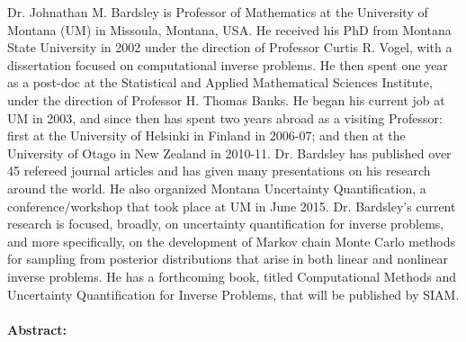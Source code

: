 \begin{wrapfloat}{figure}{o}{0pt}
  \texttt{[image: \{images/speakers/bardsleyj@mso.umt.edu]}.jpg}
\end{wrapfloat}

Dr. Johnathan M. Bardsley is Professor of Mathematics at the University of Montana (UM) in Missoula, Montana, USA. He received his PhD from Montana State University in 2002 under the direction of Professor Curtis R. Vogel, with a dissertation focused on computational inverse problems. He then spent one year as a post-doc at the Statistical and Applied Mathematical Sciences Institute, under the direction of Professor H. Thomas Banks. He began his current job at UM in 2003, and since then has spent two years abroad as a visiting Professor: first at the University of Helsinki in Finland in 2006-07; and then at the University of Otago in New Zealand in 2010-11. Dr. Bardsley has published over 45 refereed journal articles and has given many presentations on his research around the world. He also organized Montana Uncertainty Quantification, a conference/workshop that took place at UM in June 2015. Dr. Bardsley’s current research is focused, broadly, on uncertainty quantification for inverse problems, and more specifically, on the development of Markov chain Monte Carlo methods for sampling from posterior distributions that arise in both linear and nonlinear inverse problems. He has a forthcoming book, titled Computational Methods and Uncertainty Quantification for Inverse Problems, that will be published by SIAM.  
\\\\

\textbf{Abstract:}\\


